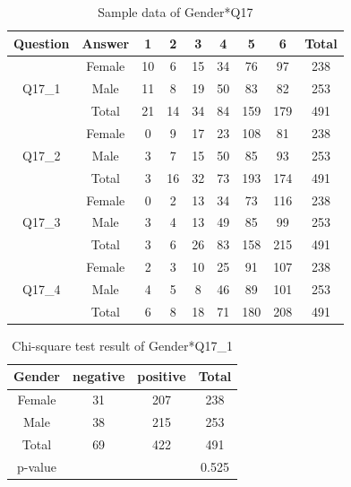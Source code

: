 \begin{table}[h]
  \caption{Sample data of Gender*Q17}
  \label{table30}
  \centering
\begin{tabular}{cc|ccccccc}
\hline
Question & Answer & 1  & 2  & 3  & 4  & 5   & 6   & Total \\
\hline
\multirow{3}{*}{Q17\_1}   & Female & 10 & 6  & 15 & 34 & 76  & 97  & 238                       \\
         & Male   & 11 & 8  & 19 & 50 & 83  & 82  & 253                       \\
         & Total  & 21 & 14 & 34 & 84 & 159 & 179 & 491                       \\
\hline
\multirow{3}{*}{Q17\_2}   & Female & 0  & 9  & 17 & 23 & 108 & 81  & 238                       \\
         & Male   & 3  & 7  & 15 & 50 & 85  & 93  & 253                       \\
         & Total  & 3  & 16 & 32 & 73 & 193 & 174 & 491                       \\
\hline
\multirow{3}{*}{Q17\_3}   & Female & 0  & 2  & 13 & 34 & 73  & 116 & 238                       \\
         & Male   & 3  & 4  & 13 & 49 & 85  & 99  & 253                       \\
         & Total  & 3  & 6  & 26 & 83 & 158 & 215 & 491                       \\
\hline
\multirow{3}{*}{Q17\_4}   & Female & 2  & 3  & 10 & 25 & 91  & 107 & 238                       \\
         & Male   & 4  & 5  & 8  & 46 & 89  & 101 & 253                       \\
         & Total  & 6  & 8  & 18 & 71 & 180 & 208 & 491                     \\
\hline         
\end{tabular}
\end{table}

\begin{table}[h]
  \caption{Chi-square test result of Gender*Q17\_1 }
  \label{table31a}
  \centering
\begin{tabular}{c|ccc}
\hline
Gender & negative & positive & Total \\
\hline
Female & 31                           & 207                          & 238                       \\
Male   & 38                           & 215                          & 253                       \\
Total  & 69                           & 422                          & 491                       \\
\hline
p-value      &        &      & 0.525   \\
\hline                   
\end{tabular}
\end{table}

